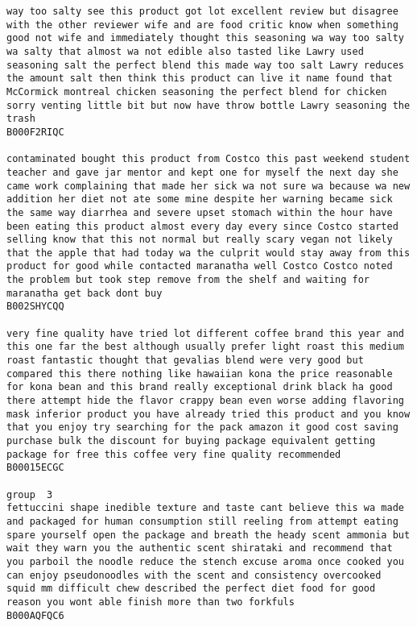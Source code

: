 \documentclass[11pt]{article}
\begin{document}
\begin{Verbatim}[commandchars=\\\{\}]
way too salty see this product got lot excellent review but disagree with the other reviewer wife and are food critic know when something good not wife and immediately thought this seasoning wa way too salty wa salty that almost wa not edible also tasted like Lawry used seasoning salt the perfect blend this made way too salt Lawry reduces the amount salt then think this product can live it name found that McCormick montreal chicken seasoning the perfect blend for chicken sorry venting little bit but now have throw bottle Lawry seasoning the trash
B000F2RIQC

contaminated bought this product from Costco this past weekend student teacher and gave jar mentor and kept one for myself the next day she came work complaining that made her sick wa not sure wa because wa new addition her diet not ate some mine despite her warning became sick the same way diarrhea and severe upset stomach within the hour have been eating this product almost every day every since Costco started selling know that this not normal but really scary vegan not likely that the apple that had today wa the culprit would stay away from this product for good while contacted maranatha well Costco Costco noted the problem but took step remove from the shelf and waiting for maranatha get back dont buy
B002SHYCQQ

very fine quality have tried lot different coffee brand this year and this one far the best although usually prefer light roast this medium roast fantastic thought that gevalias blend were very good but compared this there nothing like hawaiian kona the price reasonable for kona bean and this brand really exceptional drink black ha good there attempt hide the flavor crappy bean even worse adding flavoring mask inferior product you have already tried this product and you know that you enjoy try searching for the pack amazon it good cost saving purchase bulk the discount for buying package equivalent getting package for free this coffee very fine quality recommended
B00015ECGC

group  3
fettuccini shape inedible texture and taste cant believe this wa made and packaged for human consumption still reeling from attempt eating spare yourself open the package and breath the heady scent ammonia but wait they warn you the authentic scent shirataki and recommend that you parboil the noodle reduce the stench excuse aroma once cooked you can enjoy pseudonoodles with the scent and consistency overcooked squid mm difficult chew described the perfect diet food for good reason you wont able finish more than two forkfuls
B000AQFQC6


\end{Verbatim}
\end{document}
